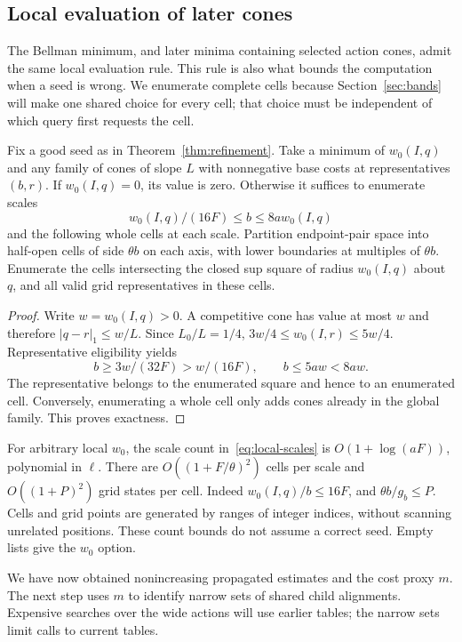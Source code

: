 \subsection{Local evaluation of later cones}

The Bellman minimum, and later minima containing selected action cones,
admit the same local evaluation rule.  This rule is also what bounds the
computation when a seed is wrong. We enumerate complete cells because
Section~\ref{sec:bands} will make one shared choice for every cell; that
choice must be independent of which query first requests the cell.

\begin{lemma}\label{lem:cone-locality}
Fix a good seed as in Theorem~\ref{thm:refinement}.  Take a minimum of
$w_0(I,q)$ and any family of cones of slope $L$ with nonnegative base
costs at representatives $(b,r)$.  If $w_0(I,q)=0$, its value is zero.
Otherwise it suffices to enumerate scales
\begin{equation}\label{eq:local-scales}
 w_0(I,q)/(16F)\le b\le8a w_0(I,q)
\end{equation}
and the following whole cells at each scale.  Partition endpoint-pair
space into half-open cells of side $\theta b$ on each axis, with lower
boundaries at multiples of $\theta b$.  Enumerate the cells intersecting
the closed sup square of radius $w_0(I,q)$ about $q$, and all valid
grid representatives in these cells.
\end{lemma}

\begin{proof}
Write $w=w_0(I,q)>0$.  A competitive cone has value at most $w$ and
therefore $|q-r|_1\le w/L$.  Since $L_0/L=1/4$,
$3w/4\le w_0(I,r)\le5w/4$.  Representative eligibility yields
\[
 b\ge3w/(32F)>w/(16F),\qquad b\le5aw<8aw.
\]
The representative belongs to the enumerated square and hence to an
enumerated cell.  Conversely, enumerating a whole cell only adds cones
already in the global family.  This proves exactness.
\end{proof}

For arbitrary local $w_0$, the scale count in~\eqref{eq:local-scales}
is $O(1+\log(aF))$, polynomial in $\ell$.  There are
$O((1+F/\theta)^2)$ cells per scale and $O((1+P)^2)$ grid states per
cell.  Indeed $w_0(I,q)/b\le16F$, and
$\theta b/g_b\le P$.  Cells and grid points are generated by ranges
of integer indices, without scanning unrelated positions.  These count
bounds do not assume a correct seed.  Empty lists give the $w_0$ option.

We have now obtained nonincreasing propagated estimates and the cost
proxy $m$.  The next step uses $m$ to identify narrow sets of shared
child alignments.  Expensive searches over the wide actions will use
earlier tables; the narrow sets limit calls to current tables.
